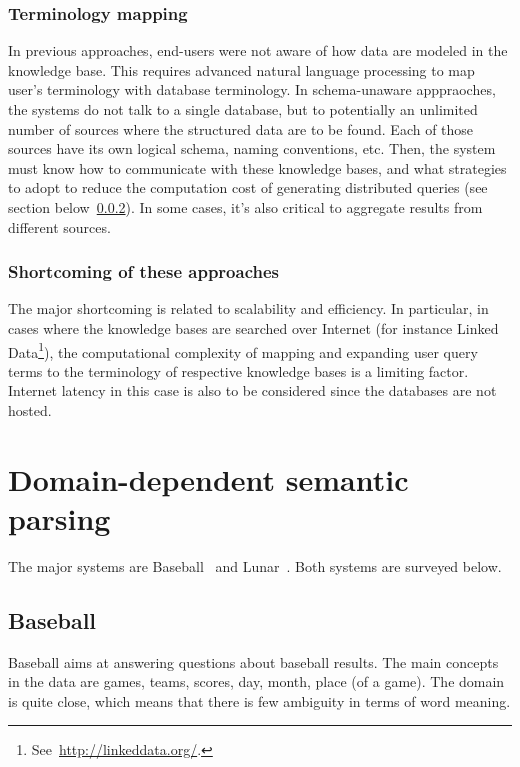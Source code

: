 \documentclass[10pt,journal,letterpaper,compsoc]{IEEEtran}
\begin{document}
\subsubsection{Terminology mapping}
In previous approaches, end-users were not aware of how data are modeled in the
knowledge base. This requires advanced natural language processing to map user's
terminology with database terminology. In schema-unaware apppraoches, the
systems do not talk to a single database, but to potentially an unlimited number
of sources where the structured data are to be found. Each of those sources have
its own logical schema, naming conventions, etc.
Then, the system must know how to communicate with these knowledge bases, and
what strategies to adopt to reduce the computation cost of generating
distributed queries (see section below~\ref{sec:schema-unaware-shortcoming}).
In some cases, it's also critical to aggregate results from different sources.


\subsubsection{Shortcoming of these approaches}
\label{sec:schema-unaware-shortcoming}
The major shortcoming is related to scalability and efficiency. In particular,
in cases where the knowledge bases are searched over Internet (for instance
Linked Data\footnote{See~\url{http://linkeddata.org/}.}), the computational
complexity of mapping and expanding user query terms to the terminology of
respective knowledge bases is a limiting factor. Internet latency in this case
is also to be considered since the databases are not hosted.
















\section{Domain-dependent semantic parsing}
\label{sec:domain-dependent}
The major systems are {\sc Baseball}~\cite{Green:1961:BAQ:1460690.1460714} and
{\sc Lunar}~\cite{Woods:1973:PNL:1499586.1499695}.
Both systems are surveyed below.


\subsection{{\sc Baseball}~\cite{Green:1961:BAQ:1460690.1460714}}
{\sc Baseball} aims at answering questions about baseball results. The main
concepts in the data are games, teams, scores, day, month, place (of a
game). The domain is quite close, which means that there is few ambiguity in
terms of word meaning. 
\end{document}
